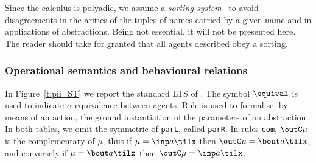 Since the calculus is polyadic, 
we assume a \emph{sorting system}~\cite{Mil91}
   to avoid disagreements  in the arities of
the tuples of names 
carried by a given name 
and in applications of abstractions.
Being not essential, it will not be presented here.
The reader should
take for granted that all agents described obey a sorting. 



\subsubsection{Operational semantics and behavioural relations}
\label{sss:os_piI}

In Figure~\ref{t:pii_ST}
we report the standard LTS of \piI.
The symbol $\equival$ is used to indicate $\alpha$-equivalence
between \piI agents.
Rule  {} is used to formalise, by means of an action, the ground instantiation
of the parameters of an abstraction. 
In both tables, we omit the symmetric of {\tt parL}, called {\tt parR}.
In rules {\tt com}, $\outC \mu$ is the complementary of $\mu$, 
thus if $\mu = \inp  a \tilx$
then  $\outC\mu = \bout  a \tilx$, and conversely if  $\mu = \bout  a \tilx$
then  $\outC\mu = \inp  a \tilx$. 


